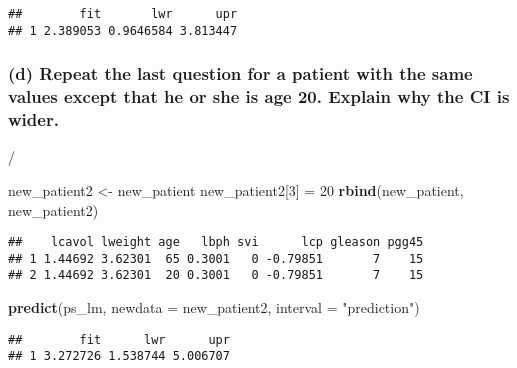 \documentclass[
]{article}
\newenvironment{Shaded}{\begin{snugshade}}{\end{snugshade}}
\newcommand{\DataTypeTok}[1]{\textcolor[rgb]{0.13,0.29,0.53}{#1}}
\newcommand{\DecValTok}[1]{\textcolor[rgb]{0.00,0.00,0.81}{#1}}
\newcommand{\KeywordTok}[1]{\textcolor[rgb]{0.13,0.29,0.53}{\textbf{#1}}}
\newcommand{\NormalTok}[1]{#1}
\newcommand{\StringTok}[1]{\textcolor[rgb]{0.31,0.60,0.02}{#1}}
\begin{document}
\begin{verbatim}
##        fit       lwr      upr
## 1 2.389053 0.9646584 3.813447
\end{verbatim}

\hypertarget{d-repeat-the-last-question-for-a-patient-with-the-same-values-except-that-he-or-she-is-age-20.-explain-why-the-ci-is-wider.}{%
\subsubsection{(d) Repeat the last question for a patient with the same
values except that he or she is age 20. Explain why the CI is
wider.}\label{d-repeat-the-last-question-for-a-patient-with-the-same-values-except-that-he-or-she-is-age-20.-explain-why-the-ci-is-wider.}}

/

\begin{Shaded}
\begin{Highlighting}[]
\NormalTok{new_patient2 <-}\StringTok{ }\NormalTok{new_patient}
\NormalTok{new_patient2[}\DecValTok{3}\NormalTok{] =}\StringTok{ }\DecValTok{20}
\KeywordTok{rbind}\NormalTok{(new_patient, new_patient2)}
\end{Highlighting}
\end{Shaded}

\begin{verbatim}
##    lcavol lweight age   lbph svi      lcp gleason pgg45
## 1 1.44692 3.62301  65 0.3001   0 -0.79851       7    15
## 2 1.44692 3.62301  20 0.3001   0 -0.79851       7    15
\end{verbatim}

\begin{Shaded}
\begin{Highlighting}[]
\KeywordTok{predict}\NormalTok{(ps_lm, }\DataTypeTok{newdata =}\NormalTok{ new_patient2, }\DataTypeTok{interval =} \StringTok{"prediction"}\NormalTok{)}
\end{Highlighting}
\end{Shaded}

\begin{verbatim}
##        fit      lwr      upr
## 1 3.272726 1.538744 5.006707
\end{verbatim}
\end{document}
